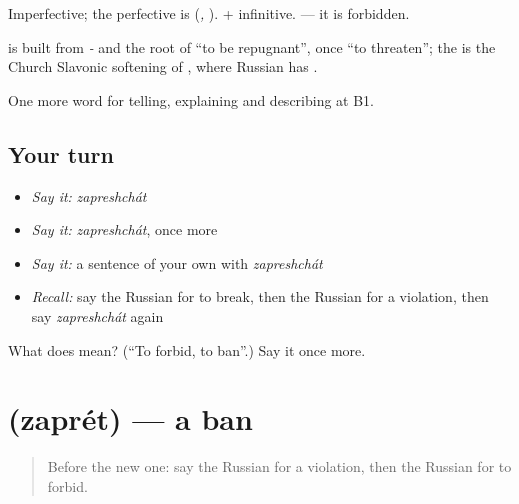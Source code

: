 Imperfective; the perfective is \emph{} (\emph{, }). \emph{ } + infinitive. \emph{} — it is forbidden.

\begin{cousinweb}
\textbf{} is built from \emph{-} and the root of \emph{} \textquotedblleft{}to be repugnant\textquotedblright{}, once \textquotedblleft{}to threaten\textquotedblright{}; the \emph{} is the Church Slavonic softening of \emph{}, where Russian has \emph{}.
\end{cousinweb}

\begin{grammarlens}[title={What you've built}]
One more word for telling, explaining and describing at B1.
\end{grammarlens}

\subsection*{Your turn}
\begin{itemize}
\raggedright
  \item \emph{Say it:} \emph{zapreshchát}
  \item \emph{Say it:} \emph{zapreshchát}, once more
  \item \emph{Say it:} a sentence of your own with \emph{zapreshchát}
  \item \emph{Recall:} say the Russian for to break, then the Russian for a violation, then say \emph{zapreshchát} again
\end{itemize}

\begin{tcolorbox}[breakable,colback=teal!4,colframe=teal!35!black,title={Before you move on}]
What does  mean? (\textquotedblleft{}To forbid, to ban\textquotedblright{}.) Say it once more.
\end{tcolorbox}
\section[\texorpdfstring{\ru{запрет} (zaprét)}{запрет (zaprét)}]{ (zaprét) — a ban}

\label{lesson:RU-C389-zapret}



\begin{quote}
Before the new one: say the Russian for a violation, then the Russian for to forbid.
\end{quote}

